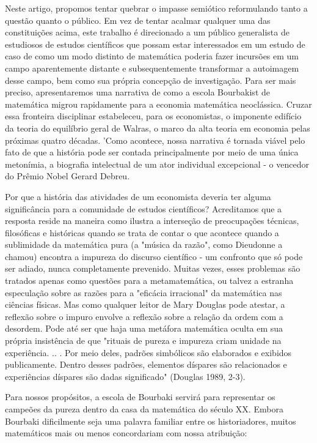 \documentclass[12pt]{article}
\begin{document}
Neste artigo, propomos tentar quebrar o impasse semiótico reformulando tanto a questão quanto o público. Em vez de tentar acalmar qualquer uma das constituições acima, este trabalho é direcionado a um público generalista de estudiosos de estudos científicos que possam estar interessados em um estudo de caso de como um modo distinto de matemática poderia fazer incursões em um campo aparentemente distante e subsequentemente transformar a autoimagem desse campo, bem como sua própria concepção de investigação. Para ser mais preciso, apresentaremos uma narrativa de como a escola Bourbakist de matemática migrou rapidamente para a economia matemática neoclássica. Cruzar essa fronteira disciplinar estabeleceu, para os economistas, o imponente edifício da teoria do equilíbrio geral de Walras, o marco da alta teoria em economia pelas próximas quatro décadas. 'Como acontece, nossa narrativa é tornada viável pelo fato de que a história pode ser contada principalmente por meio de uma única metonímia, a biografia intelectual de um ator individual excepcional - o vencedor do Prêmio Nobel Gerard Debreu.

Por que a história das atividades de um economista deveria ter alguma significância para a comunidade de estudos científicos? Acreditamos que a resposta reside na maneira como ilustra a interseção de preocupações técnicas, filosóficas e históricas quando se trata de contar o que acontece quando a sublimidade da matemática pura (a "música da razão", como Dieudonne a chamou) encontra a impureza do discurso científico - um confronto que só pode ser adiado, nunca completamente prevenido. Muitas vezes, esses problemas são tratados apenas como questões para a metamatemática, ou talvez a estranha especulação sobre as razões para a "eficácia irracional" da matemática nas ciências físicas. Mas como qualquer leitor de Mary Douglas pode atestar, a reflexão sobre o impuro envolve a reflexão sobre a relação da ordem com a desordem. Pode até ser que haja uma metáfora matemática oculta em sua própria insistência de que "rituais de pureza e impureza criam unidade na experiência. .. . Por meio deles, padrões simbólicos são elaborados e exibidos publicamente. Dentro desses padrões, elementos díspares são relacionados e experiências díspares são dadas significado" (Douglas 1989, 2-3).

Para nossos propósitos, a escola de Bourbaki servirá para representar os campeões da pureza dentro da casa da matemática do século XX. Embora Bourbaki dificilmente seja uma palavra familiar entre os historiadores, muitos matemáticos mais ou menos concordariam com nossa atribuição:
\end{document}

